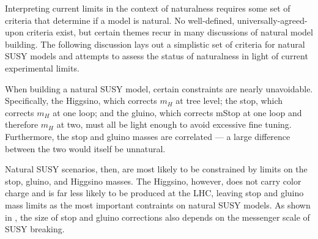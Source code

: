 \documentclass[12pt]{article}
\begin{document}
    Interpreting current limits in the context of naturalness requires some set of criteria that determine if a model is natural. No well-defined, universally-agreed-upon criteria exist, but certain themes recur in many discussions of natural model building. The following discussion lays out a simplistic set of criteria for natural SUSY models and attempts to assess the status of naturalness in light of current experimental limits.
    
    When building a natural SUSY model, certain constraints are nearly unavoidable. Specifically, the Higgsino, which corrects $m_H$ at tree level; the stop, which corrects $m_H$ at one loop; and the gluino, which corrects mStop at one loop and therefore $m_H$ at two, must all be light enough to avoid excessive fine tuning. Furthermore, the stop and gluino masses are correlated --- a large difference between the two would itself be unnatural.

    Natural SUSY scenarios, then, are most likely to be constrained by limits on the stop, gluino, and Higgsino masses. The Higgsino, however, does not carry color charge and is far less likely to be produced at the LHC, leaving stop and gluino mass limits as the most important contraints on natural SUSY models. As shown in , the size of stop and gluino corrections also depends on the messenger scale of SUSY breaking.  
\end{document}
